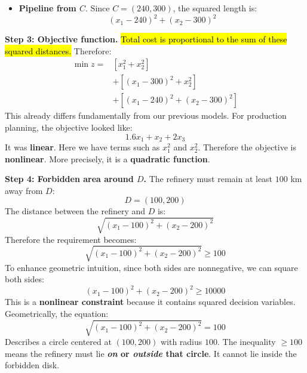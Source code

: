 \begin{examplebox}
\begin{itemize}
        \item \textbf{Pipeline from $C$}. Since $C=(240,300)$, the squared length is:
            \begin{equation*}
                (x_1-240)^2+(x_2-300)^2
            \end{equation*}
    \end{itemize}

    \highspace
    \textcolor{Green3}{ \textbf{Step 3: Objective function.}} \hl{Total cost is proportional to the sum of these squared distances.} Therefore:
    \begin{equation*}
        \boxed{
            \begin{aligned}
                \min z={}&
                \left[x_1^2+x_2^2\right]\\
                &+\left[(x_1-300)^2+x_2^2\right]\\
                &+\left[(x_1-240)^2+(x_2-300)^2\right]
            \end{aligned}
        }
    \end{equation*}
    This already differs fundamentally from our previous models. For production planning, the objective looked like:
    \begin{equation*}
        1.6x_1+x_2+2x_3
    \end{equation*}
    It was \textbf{linear}. Here we have terms such as $x_1^2$ and $x_2^2$. Therefore the objective is \textbf{nonlinear}. More precisely, it is a \textbf{quadratic function}.

    \highspace
    \textcolor{Green3}{ \textbf{Step 4: Forbidden area around $D$.}} The refinery must remain at least $100$ km away from $D$:
    \begin{equation*}
        D=(100,200)
    \end{equation*}
    The distance between the refinery and $D$ is:
    \begin{equation*}
        \sqrt{(x_1-100)^2+(x_2-200)^2}
    \end{equation*}
    Therefore the requirement becomes:
    \begin{equation*}
        \boxed{
            \sqrt{(x_1-100)^2+(x_2-200)^2}\geq100
        }
    \end{equation*}
    To enhance geometric intuition, since both sides are nonnegative, we can square both sides:
    \begin{equation*}
        (x_1-100)^2+(x_2-200)^2\geq10000
    \end{equation*}
    This is a \textbf{nonlinear constraint} because it contains squared decision variables. Geometrically, the equation:
    \begin{equation*}
        \sqrt{(x_1-100)^2+(x_2-200)^2}=100
    \end{equation*}
    Describes a circle centered at $(100,200)$ with radius $100$. The inequality $\geq 100$ means the refinery must lie \textbf{\emph{on} or \emph{outside} that circle}. It cannot lie inside the forbidden disk.


\end{examplebox}
